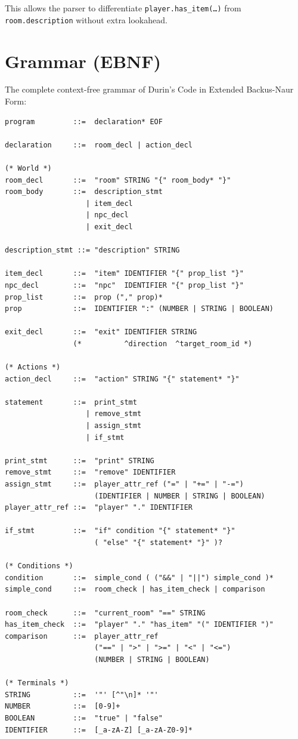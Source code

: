 \documentclass[12pt, a4paper]{article}
\begin{document}
This allows the parser to differentiate \texttt{player.has\_item(\ldots)} from
\texttt{room.description} without extra lookahead.

\section{Grammar (EBNF)}

The complete context-free grammar of Durin's Code in Extended Backus-Naur Form:

\begin{lstlisting}[language={}, basicstyle=\ttfamily\small, frame=single,
    backgroundcolor=\color{code-bg}, caption={Complete EBNF Grammar}]
program         ::=  declaration* EOF

declaration     ::=  room_decl | action_decl

(* World *)
room_decl       ::=  "room" STRING "{" room_body* "}"
room_body       ::=  description_stmt
                   | item_decl
                   | npc_decl
                   | exit_decl

description_stmt ::= "description" STRING

item_decl       ::=  "item" IDENTIFIER "{" prop_list "}"
npc_decl        ::=  "npc"  IDENTIFIER "{" prop_list "}"
prop_list       ::=  prop ("," prop)*
prop            ::=  IDENTIFIER ":" (NUMBER | STRING | BOOLEAN)

exit_decl       ::=  "exit" IDENTIFIER STRING
                (*          ^direction  ^target_room_id *)

(* Actions *)
action_decl     ::=  "action" STRING "{" statement* "}"

statement       ::=  print_stmt
                   | remove_stmt
                   | assign_stmt
                   | if_stmt

print_stmt      ::=  "print" STRING
remove_stmt     ::=  "remove" IDENTIFIER
assign_stmt     ::=  player_attr_ref ("=" | "+=" | "-=")
                     (IDENTIFIER | NUMBER | STRING | BOOLEAN)
player_attr_ref ::=  "player" "." IDENTIFIER

if_stmt         ::=  "if" condition "{" statement* "}"
                     ( "else" "{" statement* "}" )?

(* Conditions *)
condition       ::=  simple_cond ( ("&&" | "||") simple_cond )*
simple_cond     ::=  room_check | has_item_check | comparison

room_check      ::=  "current_room" "==" STRING
has_item_check  ::=  "player" "." "has_item" "(" IDENTIFIER ")"
comparison      ::=  player_attr_ref
                     ("==" | ">" | ">=" | "<" | "<=")
                     (NUMBER | STRING | BOOLEAN)

(* Terminals *)
STRING          ::=  '"' [^"\n]* '"'
NUMBER          ::=  [0-9]+
BOOLEAN         ::=  "true" | "false"
IDENTIFIER      ::=  [_a-zA-Z] [_a-zA-Z0-9]*
\end{lstlisting}
\end{document}
